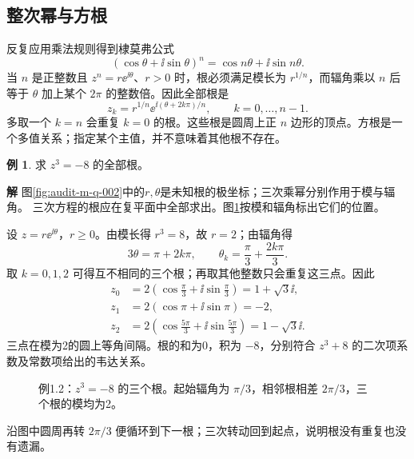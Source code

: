 \documentclass[11pt,openany,fontset=fandol]{ctexbook}
\theoremstyle{plain}\newtheorem{theorem}{定理}[chapter]\newtheorem{proposition}[theorem]{命题}
\theoremstyle{definition}\newtheorem{definition}{定义}[chapter]\newtheorem{example}{例}[chapter]
\theoremstyle{remark}\newtheorem*{remark}{说明}
\newcommand{\SolutionStart}{\par\nobreak\medskip\nobreak\noindent\textbf{解}\quad\ignorespaces}
\newenvironment{solution}{\SolutionStart}{\par\medskip}
\begin{document}
\subsection{整次幂与方根}
反复应用乘法规则得到棣莫弗公式
\begin{equation}
(\cos\theta+\ii\sin\theta)^n=\cos n\theta+\ii\sin n\theta.
\end{equation}
当 $n$ 是正整数且 $z^n=r\ee^{\ii\theta}$、$r>0$ 时，根必须满足模长为 $r^{1/n}$，而辐角乘以 $n$ 后等于 $\theta$ 加上某个 $2\pi$ 的整数倍。因此全部根是
\begin{equation}
z_k=r^{1/n}\ee^{\ii(\theta+2k\pi)/n},\qquad k=0,\ldots,n-1.
\end{equation}
多取一个 $k=n$ 会重复 $k=0$ 的根。这些根是圆周上正 $n$ 边形的顶点。方根是一个多值关系；指定某个主值，并不意味着其他根不存在。

\begin{example}
求 $z^3=-8$ 的全部根。
\end{example}

\begin{solution}
图\ref{fig:audit-m-q-002}中的$r,\theta$是未知根的极坐标；三次乘幂分别作用于模与辐角。
三次方程的根应在复平面中全部求出。图\ref{fig:eg-1-2}按模和辐角标出它们的位置。

设 $z=r\ee^{\ii\theta}$，$r\ge0$。由模长得 $r^3=8$，故 $r=2$；由辐角得
\[
3\theta=\pi+2k\pi,\qquad
\theta_k=\frac\pi3+\frac{2k\pi}3.
\]
取 $k=0,1,2$ 可得互不相同的三个根；再取其他整数只会重复这三点。因此
\begin{align*}
z_0&=2(\cos\tfrac\pi3+\ii\sin\tfrac\pi3)=1+\sqrt3\ii,\\
z_1&=2(\cos\pi+\ii\sin\pi)=-2,\\
z_2&=2(\cos\tfrac{5\pi}3+\ii\sin\tfrac{5\pi}3)=1-\sqrt3\ii.
\end{align*}
三点在模为2的圆上等角间隔。根的和为0，积为 $-8$，分别符合 $z^3+8$ 的二次项系数及常数项给出的韦达关系。

\begin{figure}[H]\centering
{}
\caption{例1.2：$z^3=-8$ 的三个根。起始辐角为 $\pi/3$，相邻根相差 $2\pi/3$，三个根的模均为2。}\label{fig:eg-1-2}
\end{figure}

沿图中圆周再转 $2\pi/3$ 便循环到下一根；三次转动回到起点，说明根没有重复也没有遗漏。
\end{solution}
\end{document}

